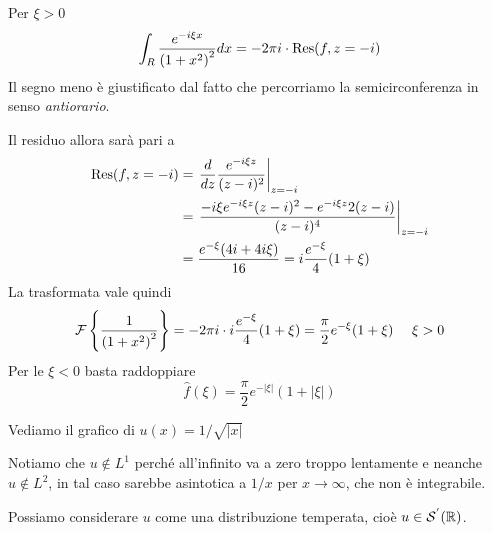 Per $\xi  > 0$
\begin{equation*}
\int _{R}\frac{e^{ - i\xi x}}{\left(1 + x^{2}\right)^{2}} dx = -2\pi i\cdot \operatorname{Res} (f,z = -i)
\end{equation*}
Il segno meno è giustificato dal fatto che percorriamo la semicirconferenza in senso \textit{antiorario}.

Il residuo allora sarà pari a
\begin{equation*}
\begin{aligned}
\operatorname{Res} (f,z = -i) & = \left. \frac{d}{dz}\frac{e^{ - i\xi z}}{(z - i)^{2}}\right| _{z = -i}\\
 & = \left. \frac{ - i\xi e^{ - i\xi z}(z - i)^{2} - e^{ - i\xi z} 2(z - i)}{(z - i)^{4}}\right| _{z = -i}\\
 & = \frac{e^{ - \xi }(4i + 4i\xi)}{16} = i\frac{e^{ - \xi }}{4} (1 + \xi)
\end{aligned}
\end{equation*}
La trasformata vale quindi
\begin{equation*}
\mathcal{F} \left\{\frac{1}{\left(1 + x^{2}\right)^{2}}\right\} = - 2\pi i\cdot i\frac{e^{ - \xi }}{4} (1 + \xi) = \frac{\pi }{2} e^{ - \xi }(1 + \xi) \ \ \ \ \xi  > 0
\end{equation*}
Per le $\xi < 0$ basta raddoppiare
\begin{equation*}
\hat{f}(\xi) = \frac{\pi }{2} e^{ - | \xi | } (1 + | \xi |)
\end{equation*}
\Soluzione

Vediamo il grafico di $u(x) = 1/\sqrt{|x|}$


Notiamo che $u\notin L^{1}$ perché all'infinito va a zero troppo lentamente e neanche $u\notin L^{2}$, in tal caso sarebbe asintotica a $1/x$ per $x\rightarrow \infty $, che non è integrabile.

Possiamo considerare $u$ come una distribuzione temperata, cioè $u\in \mathcal{S} ^{'}(\mathbb{R})$.

